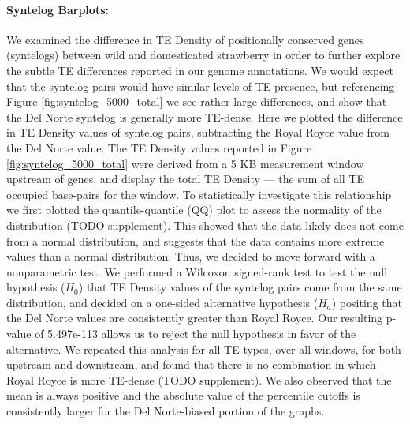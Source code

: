 \documentclass[fleqn,10pt]{olplainarticle}
\begin{document}
\paragraph{Syntelog Barplots:}
We examined the difference in TE Density of positionally conserved genes (syntelogs) between wild and domesticated strawberry in order to further explore the subtle TE differences reported in our genome annotations.
We would expect that the syntelog pairs would have similar levels of TE presence, but referencing Figure \ref{fig:syntelog_5000_total} we see rather large differences, and show that the Del Norte syntelog is generally more TE-dense. Here we plotted the difference in TE Density values of syntelog pairs, subtracting the Royal Royce value from the Del Norte value.
The TE Density values reported in Figure \ref{fig:syntelog_5000_total} were derived from a 5 KB measurement window upstream of genes, and display the total TE Density --- the sum of all TE occupied base-pairs for the window.
To statistically investigate this relationship we first plotted the quantile-quantile (QQ) plot to assess the normality of the distribution (TODO supplement).
This showed that the data likely does not come from a normal distribution, and suggests that the data contains more extreme values than a normal distribution.
Thus, we decided to move forward with a nonparametric test.
We performed a Wilcoxon signed-rank test to test the null hypothesis ($H_{0}$) that TE Density values of the syntelog pairs come from the same distribution, and decided on a one-sided alternative hypothesis ($H_{a}$) positing that the Del Norte values are consistently greater than Royal Royce.
Our resulting p-value of 5.497e-113 allows us to reject the null hypothesis in favor of the alternative.
We repeated this analysis for all TE types, over all windows, for both upstream and downstream, and found that there is no combination in which Royal Royce is more TE-dense (TODO supplement).
We also observed that the mean is always positive and the absolute value of the percentile cutoffs is consistently larger for the Del Norte-biased portion of the graphs.

\end{document}
